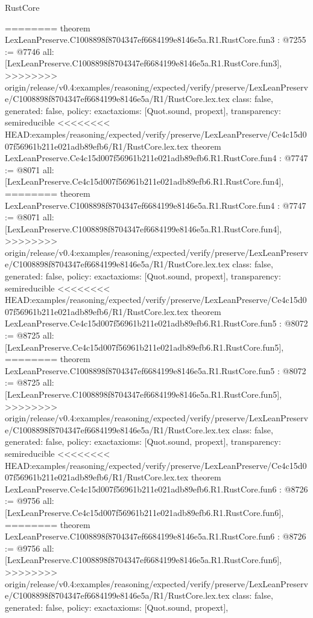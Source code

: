 \begin{lexlean}{RustCore}
\begin{coremodule}
{\begin{coremodule}
{{{{{{========
theorem LexLeanPreserve.C1008898f8704347ef6684199e8146e5a.R1.RustCore.fun3 : @7255 := @7746 {
  all: [LexLeanPreserve.C1008898f8704347ef6684199e8146e5a.R1.RustCore.fun3],
>>>>>>>> origin/release/v0.4:examples/reasoning/expected/verify/preserve/LexLeanPreserve/C1008898f8704347ef6684199e8146e5a/R1/RustCore.lex.tex
  class: false,
  generated: false,
  policy: exact{axioms: [Quot.sound, propext]},
  transparency: semireducible
}
<<<<<<<< HEAD:examples/reasoning/expected/verify/preserve/LexLeanPreserve/Ce4c15d007f56961b211e021adb89efb6/R1/RustCore.lex.tex
theorem LexLeanPreserve.Ce4c15d007f56961b211e021adb89efb6.R1.RustCore.fun4 : @7747 := @8071 {
  all: [LexLeanPreserve.Ce4c15d007f56961b211e021adb89efb6.R1.RustCore.fun4],
========
theorem LexLeanPreserve.C1008898f8704347ef6684199e8146e5a.R1.RustCore.fun4 : @7747 := @8071 {
  all: [LexLeanPreserve.C1008898f8704347ef6684199e8146e5a.R1.RustCore.fun4],
>>>>>>>> origin/release/v0.4:examples/reasoning/expected/verify/preserve/LexLeanPreserve/C1008898f8704347ef6684199e8146e5a/R1/RustCore.lex.tex
  class: false,
  generated: false,
  policy: exact{axioms: [Quot.sound, propext]},
  transparency: semireducible
}
<<<<<<<< HEAD:examples/reasoning/expected/verify/preserve/LexLeanPreserve/Ce4c15d007f56961b211e021adb89efb6/R1/RustCore.lex.tex
theorem LexLeanPreserve.Ce4c15d007f56961b211e021adb89efb6.R1.RustCore.fun5 : @8072 := @8725 {
  all: [LexLeanPreserve.Ce4c15d007f56961b211e021adb89efb6.R1.RustCore.fun5],
========
theorem LexLeanPreserve.C1008898f8704347ef6684199e8146e5a.R1.RustCore.fun5 : @8072 := @8725 {
  all: [LexLeanPreserve.C1008898f8704347ef6684199e8146e5a.R1.RustCore.fun5],
>>>>>>>> origin/release/v0.4:examples/reasoning/expected/verify/preserve/LexLeanPreserve/C1008898f8704347ef6684199e8146e5a/R1/RustCore.lex.tex
  class: false,
  generated: false,
  policy: exact{axioms: [Quot.sound, propext]},
  transparency: semireducible
}
<<<<<<<< HEAD:examples/reasoning/expected/verify/preserve/LexLeanPreserve/Ce4c15d007f56961b211e021adb89efb6/R1/RustCore.lex.tex
theorem LexLeanPreserve.Ce4c15d007f56961b211e021adb89efb6.R1.RustCore.fun6 : @8726 := @9756 {
  all: [LexLeanPreserve.Ce4c15d007f56961b211e021adb89efb6.R1.RustCore.fun6],
========
theorem LexLeanPreserve.C1008898f8704347ef6684199e8146e5a.R1.RustCore.fun6 : @8726 := @9756 {
  all: [LexLeanPreserve.C1008898f8704347ef6684199e8146e5a.R1.RustCore.fun6],
>>>>>>>> origin/release/v0.4:examples/reasoning/expected/verify/preserve/LexLeanPreserve/C1008898f8704347ef6684199e8146e5a/R1/RustCore.lex.tex
  class: false,
  generated: false,
  policy: exact{axioms: [Quot.sound, propext]},
}}}}}}}}}}
\end{coremodule}}
\end{coremodule}
\end{lexlean}
